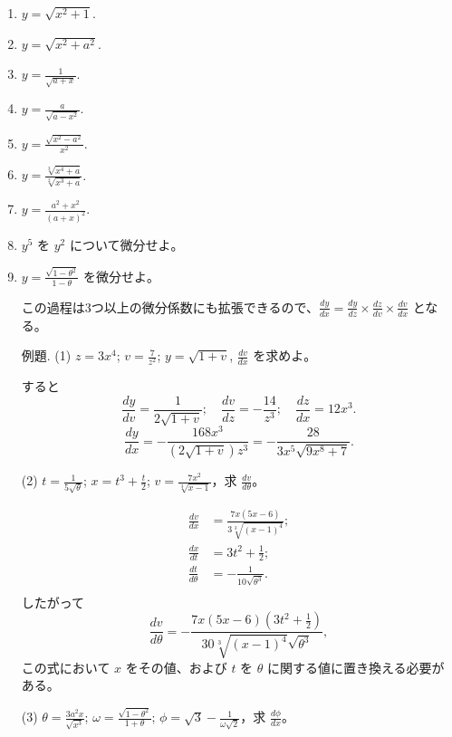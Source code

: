 \documentclass[a4paper,11pt,openany]{ltjsbook}
\begin{document}
\begin{enumerate}
\item[(1)] \(y = \sqrt{x^2 + 1}\).
\item[(2)] \(y = \sqrt{x^2+a^2}\).

\item[(3)] \(y = \frac{1}{\sqrt{a+x}}\).
\item[(4)] \(y = \frac{a}{\sqrt{a-x^2}}\).

\item[(5)] \(y = \frac{\sqrt{x^2-a^2}}{x^2}\).
\item[(6)] \(y = \frac{\sqrt[3]{x^4+a}}{\sqrt[2]{x^3+a}}\).

\item[(7)] \(y = \frac{a^2+x^2}{(a+x)^2}\).

\item[(8)] \(y^5\) を \(y^2\) について微分せよ。

\item[(9)] \(y = \frac{\sqrt{1 - \theta^2}}{1 - \theta}\) を微分せよ。

この過程は3つ以上の微分係数にも拡張できるので、\(\frac{dy}{dx} = \frac{dy}{dz} \times \frac{dz}{dv} \times \frac{dv}{dx}\) となる。

例題.
(1) \(z = 3x^4\); \(v = \frac{7}{z^2}\); \(y = \sqrt{1+v}\), \(\frac{dv}{dx}\) を求めよ。

すると
\[
\frac{dy}{dv} = \frac{1}{2\sqrt{1+v}}; \quad
\frac{dv}{dz} = -\frac{14}{z^3}; \quad
\frac{dz}{dx} = 12x^3.
\]
\[
\frac{dy}{dx} = -\frac{168x^3}{(2\sqrt{1+v})z^3}
               = -\frac{28}{3x^5\sqrt{9x^8+7}}.
\]

(2) \( t = \frac{1}{5\sqrt{\theta}} \); \( x = t^3 + \frac{t}{2} \); \( v = \frac{7x^2}{\sqrt[3]{x-1}} \)，求 \(\frac{dv}{d\theta}\)。

\[
\begin{aligned}
\frac{dv}{dx} &= \frac{7x(5x-6)}{3\sqrt[3]{(x-1)^4}}; \\
\frac{dx}{dt} &= 3t^2 + \frac{1}{2}; \\
\frac{dt}{d\theta} &= -\frac{1}{10\sqrt{\theta^3}}. \\
\end{aligned}
\]
したがって
\[
\frac{dv}{d\theta}
  = -\frac{7x(5x-6)(3t^2+\frac{1}{2})}
          {30\sqrt[3]{(x-1)^4} \sqrt{\theta^3}},
\]
この式において \( x \) をその値、および \( t \) を \(\theta\) に関する値に置き換える必要がある。

(3) \( \theta = \frac{3a^2x}{\sqrt{x^3}} \); \( \omega = \frac{\sqrt{1-\theta^2}}{1+\theta} \); \( \phi = \sqrt{3} - \frac{1}{\omega\sqrt{2}} \)，求 \(\frac{d\phi}{dx}\)。


\end{enumerate}
\end{document}
